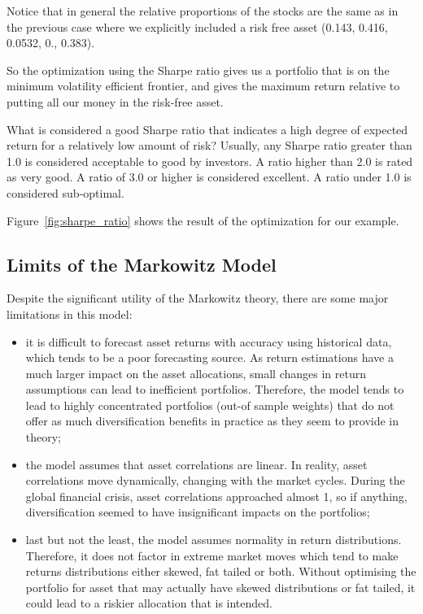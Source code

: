 Notice that in general the relative proportions of the stocks are the
same as in the previous case where we explicitly included a risk free
asset (0.143, 0.416, 0.0532, 0., 0.383).

So the optimization using the Sharpe ratio gives us a portfolio that is
on the minimum volatility efficient frontier, and gives the maximum
return relative to putting all our money in the risk-free asset.

What is considered a good Sharpe ratio that indicates a high degree of
expected return for a relatively low amount of risk? Usually, any Sharpe
ratio greater than 1.0 is considered acceptable to good by investors. A
ratio higher than 2.0 is rated as very good. A ratio of 3.0 or higher is
considered excellent. A ratio under 1.0 is considered sub-optimal.

Figure~\ref{fig:sharpe_ratio} shows the result of the optimization for our example.

\subsection{Limits of the Markowitz
Model}\label{limits-of-the-markowitz-model}

Despite the significant utility of the Markowitz theory, there are some
major limitations in this model:

\begin{itemize}
\tightlist
\item
  it is difficult to forecast asset returns with accuracy using
  historical data, which tends to be a poor forecasting source. As
  return estimations have a much larger impact on the asset allocations,
  small changes in return assumptions can lead to inefficient
  portfolios. Therefore, the model tends to lead to highly concentrated
  portfolios (out-of sample weights) that do not offer as much
  diversification benefits in practice as they seem to provide in
  theory;
\item
  the model assumes that asset correlations are linear. In reality,
  asset correlations move dynamically, changing with the market cycles.
  During the global financial crisis, asset correlations approached
  almost 1, so if anything, diversification seemed to have insignificant
  impacts on the portfolios;
\item
  last but not the least, the model assumes normality in return
  distributions. Therefore, it does not factor in extreme market moves
  which tend to make returns distributions either skewed, fat tailed or
  both. Without optimising the portfolio for asset that may actually
  have skewed distributions or fat tailed, it could lead to a riskier
  allocation that is intended.
\end{itemize}


